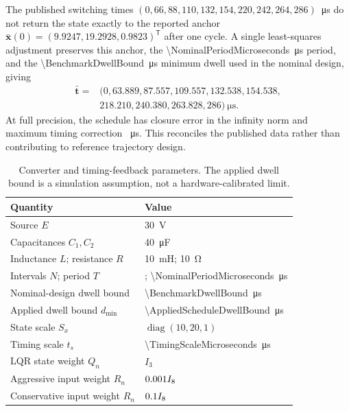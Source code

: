 \documentclass[pdflatex,iicol,sn-mathphys-ay]{sn-jnl}
\newcommand{\vect}[1]{\bm{#1}}
\begin{document}
The published switching times $(0,66,88,110,132,154,220,242,264,286)$~\si{\micro\second} do not return the state exactly to the reported anchor $\bar{\vect{x}}(0)=(9.9247,19.2928,0.9823)^{\mathsf T}$ after one cycle. A single least-squares adjustment preserves this anchor, the \SI{\NominalPeriodMicroseconds}{\micro\second} period, and the \SI{\BenchmarkDwellBound}{\micro\second} minimum dwell used in the nominal design, giving
\begin{equation}
\begin{split}
    \bar{\vect{t}}={}&(0,63.889,87.557,109.557,132.538,154.538,\\
    &218.210,240.380,263.828,286)~\si{\micro\second}.
\end{split}
\label{eq:benchmark-schedule}
\end{equation}
At full precision, the schedule has closure error \NominalClosureError{} in the infinity norm and maximum timing correction \MaximumBoundaryCorrection{}~\si{\micro\second}. This reconciles the published data rather than contributing to reference trajectory design.

\begin{table}[t]
    \centering
    \caption{Converter and timing-feedback parameters. The applied dwell bound is a simulation assumption, not a hardware-calibrated limit.}
    \label{tab:parameters}
    \begin{tabular}{ll}
        \toprule
        Quantity & Value \\
        \midrule
        Source $E$ & \SI{30}{\volt} \\
        Capacitances $C_1,C_2$ & \SI{40}{\micro\farad} \\
        Inductance $L$; resistance $R$ & \SI{10}{\milli\henry}; \SI{10}{\ohm} \\
        Intervals $N$; period $T$ & \NominalIntervalCount{}; \SI{\NominalPeriodMicroseconds}{\micro\second} \\
        Nominal-design dwell bound & \SI{\BenchmarkDwellBound}{\micro\second} \\
        Applied dwell bound $d_{\min}$ & \SI{\AppliedScheduleDwellBound}{\micro\second} \\
        State scale $S_x$ & $\operatorname{diag}(10,20,1)$ \\
        Timing scale $t_s$ & \SI{\TimingScaleMicroseconds}{\micro\second} \\
        LQR state weight $Q_n$ & $I_3$ \\
        Aggressive input weight $R_n$ & $0.001 I_8$ \\
        Conservative input weight $R_n$ & $0.1 I_8$ \\
        \bottomrule
    \end{tabular}
\end{table}
\end{document}
